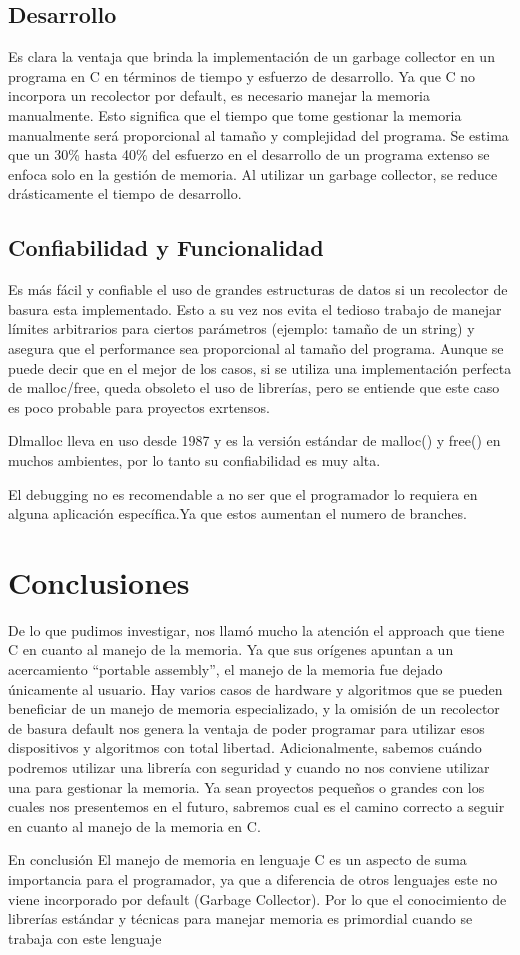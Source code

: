 \documentclass[11pt]{article} %
\begin{document}
\subsection{Desarrollo}
	Es clara la ventaja que brinda la implementación de un garbage collector en un programa en C en términos de tiempo y esfuerzo de desarrollo. Ya que C no incorpora un recolector por default, es necesario manejar la memoria manualmente. Esto significa que el tiempo que tome gestionar la memoria manualmente será proporcional al tamaño y complejidad del programa. Se estima que un 30\% hasta 40\% del esfuerzo en el desarrollo de un programa extenso se enfoca solo en la gestión de memoria. Al utilizar un garbage collector, se reduce drásticamente el tiempo de desarrollo.
\subsection{Confiabilidad y Funcionalidad}
	Es más fácil y confiable el uso de grandes estructuras de datos si un recolector de basura esta implementado. Esto a su vez nos evita el tedioso trabajo de manejar límites arbitrarios para ciertos parámetros (ejemplo: tamaño de un string) y asegura que el performance sea proporcional al tamaño del programa. Aunque se puede decir que en el mejor de los casos, si se utiliza una implementación perfecta de malloc/free, queda obsoleto el uso de librerías, pero se entiende que este caso es poco probable para proyectos exrtensos.

Dlmalloc lleva en uso desde 1987 y es la versión estándar de malloc() y free() en muchos ambientes, por lo tanto su confiabilidad es muy alta.

El debugging no es recomendable a no ser que el programador lo requiera en alguna aplicación específica.Ya que estos aumentan el numero de branches.

\section{Conclusiones}
	De lo que pudimos investigar, nos llamó mucho la atención el approach que tiene C en cuanto al manejo de la memoria. Ya que sus orígenes apuntan a un acercamiento “portable assembly”, el manejo de la memoria fue dejado únicamente al usuario. Hay varios casos de hardware y algoritmos que se pueden beneficiar de un manejo de memoria especializado, y la omisión de un recolector de basura default nos genera la ventaja de poder programar para utilizar esos dispositivos y algoritmos con total libertad.
	Adicionalmente, sabemos cuándo podremos utilizar una librería con seguridad y cuando no nos conviene utilizar una para gestionar la memoria. Ya sean proyectos pequeños o grandes con los cuales nos presentemos en el futuro, sabremos cual es el camino correcto a seguir en cuanto al manejo de la memoria en C.

En conclusión El manejo de memoria en lenguaje C es un aspecto de suma importancia para el programador, ya que a diferencia de otros lenguajes este no viene incorporado por default (Garbage Collector). Por lo que el conocimiento de librerías estándar y técnicas para manejar memoria es primordial cuando se trabaja con este lenguaje
\end{document}
